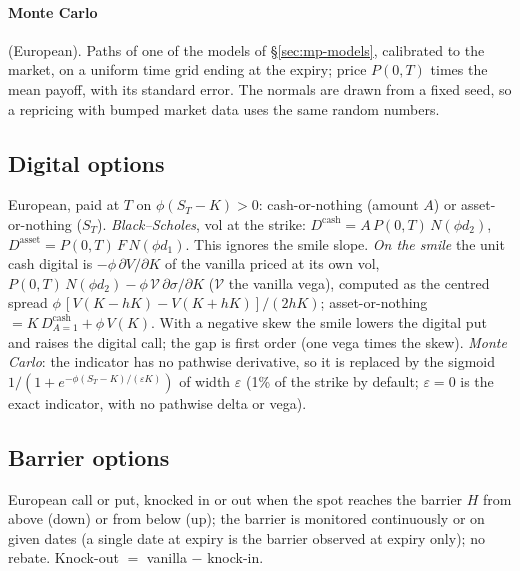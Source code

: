 \paragraph{Monte Carlo} (European). Paths of one of the models of \S\ref{sec:mp-models}, calibrated to the market, on a
uniform time grid ending at the expiry; price $P(0,T)$ times the mean payoff, with its standard error. The normals are
drawn from a fixed seed, so a repricing with bumped market data uses the same random numbers.

\subsection{Digital options}\label{sec:mp-digital}
European, paid at $T$ on $\phi(S_T - K) > 0$: cash-or-nothing (amount $A$) or asset-or-nothing ($S_T$).
\emph{Black--Scholes}, vol at the strike: $D^{\mathrm{cash}} = A\,P(0,T)\,N(\phi d_2)$, $D^{\mathrm{asset}} = P(0,T)\,F\,N(\phi d_1)$.
This ignores the smile slope. \emph{On the smile} the unit cash digital is $-\phi\,\partial V/\partial K$ of the vanilla
priced at its own vol, $P(0,T)\,N(\phi d_2) - \phi\,\mathcal{V}\,\partial\sigma/\partial K$ ($\mathcal{V}$ the vanilla
vega), computed as the centred spread $\phi\,[V(K - hK) - V(K + hK)]/(2hK)$; asset-or-nothing $= K\,D^{\mathrm{cash}}_{A=1}
+ \phi\,V(K)$. With a negative skew the smile lowers the digital put and raises the digital call; the gap is first
order (one vega times the skew).
\emph{Monte Carlo}: the indicator has no pathwise derivative, so it is replaced by the sigmoid
$1/(1 + e^{-\phi(S_T - K)/(\varepsilon K)})$ of width $\varepsilon$ (1\% of the strike by default; $\varepsilon = 0$ is the exact indicator, with
no pathwise delta or vega).

\subsection{Barrier options}\label{sec:mp-barrier}
European call or put, knocked in or out when the spot reaches the barrier $H$ from above (down) or from below (up);
the barrier is monitored continuously or on given dates (a single date at expiry is the barrier observed at expiry
only); no rebate. Knock-out $=$ vanilla $-$ knock-in.

